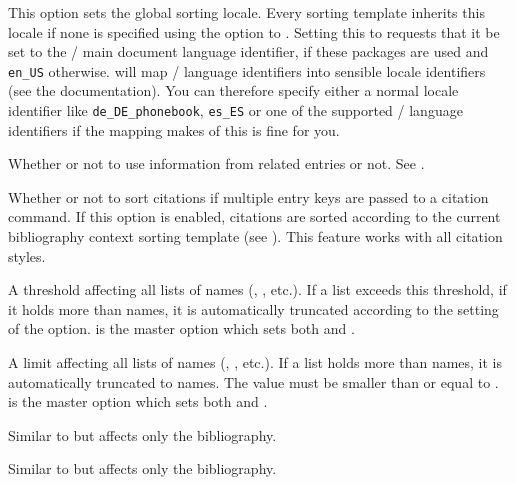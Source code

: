 \documentclass{ltxdockit}[2011/03/25]
\newcommand*{\biber}{\sty{biber}\xspace}
\begin{document}
\begin{optionlist}

This option sets the global sorting locale. Every sorting template inherits this locale if none is specified using the  option to . Setting this to  requests that it be set to the / main document language identifier, if these packages are used and \texttt{en\_US} otherwise. \biber will map / language identifiers into sensible locale identifiers (see the \biber documentation). You can therefore specify either a normal locale identifier like \texttt{de\_DE\_phonebook}, \texttt{es\_ES} or one of the supported / language identifiers if the mapping \biber makes of this is fine for you.


Whether or not to use information from related entries or not. See .


Whether or not to sort citations if multiple entry keys are passed to a citation command. If this option is enabled, citations are sorted according to the current bibliography context sorting template (see ). This feature works with all citation styles.


A threshold affecting all lists of names (, , etc.). If a list exceeds this threshold, \ie if it holds more than  names, it is automatically truncated according to the setting of the  option.  is the master option which sets both  and .


A limit affecting all lists of names (, , etc.). If a list holds more than  names, it is automatically truncated to  names. The  value must be smaller than or equal to .  is the master option which sets both  and .


Similar to  but affects only the bibliography.


Similar to  but affects only the bibliography.


\end{optionlist}
\end{document}
